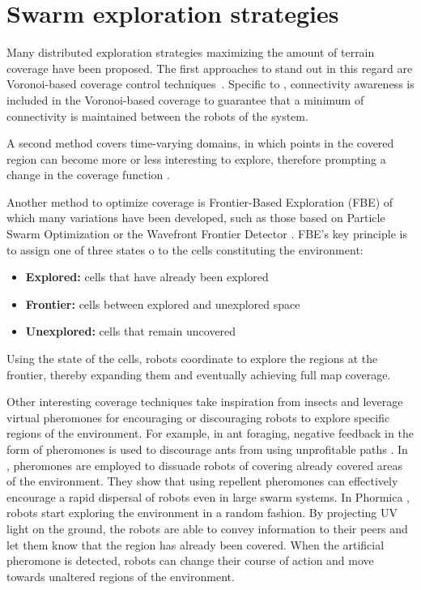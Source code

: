\section{Swarm exploration strategies}
Many distributed exploration strategies maximizing the amount of
terrain coverage have been proposed. The first approaches to stand out
in this regard are Voronoi-based coverage control
techniques~\cite{arslan2016voronoi,luo2019voronoi}.
Specific to \cite{luo2019voronoi}, connectivity awareness is included in the Voronoi-based coverage to guarantee that a minimum of connectivity is maintained between the robots of the system. 

A second method covers time-varying domains, in which points in the
covered region can become more or less interesting to explore,
therefore prompting a change in the coverage function
\cite{santos2019decentralized,xu2019multi}. 

Another method to optimize coverage is Frontier-Based Exploration (FBE)
\cite{yamauchi1998frontier} of which many variations have been
developed, such as those based on Particle Swarm Optimization
\cite{wang2011frontier} or the Wavefront Frontier Detector
\cite{topiwala2018frontier}. FBE's key principle is to assign one of three states o to the cells constituting the environment:

\begin{itemize}
\item \textbf{Explored:} cells that have already been explored
\item \textbf{Frontier:} cells between explored and unexplored space
\item \textbf{Unexplored:} cells that remain uncovered
\end{itemize}

Using the state of the cells, robots coordinate to explore the regions at the frontier, thereby expanding them and eventually achieving full map coverage.

Other interesting coverage techniques take inspiration from insects and leverage virtual pheromones for encouraging or discouraging robots to explore specific regions of the environment. For example, in ant foraging, negative feedback in the form of pheromones is used to discourage ants from using unprofitable paths \cite{robinson2005no}. In \cite{hunt2019testing}, pheromones are employed to dissuade robots of covering already covered areas of the environment. They show that using repellent pheromones can effectively encourage a rapid dispersal of robots even in large swarm systems. In Phormica \cite{salman2020phormica}, robots start exploring the environment in a random fashion. By projecting \ac{UV} light on the ground, the robots are able to convey information to their peers and let them know that the region has already been covered. When the artificial pheromone is detected, robots can change their course of action and move towards unaltered regions of the environment.

